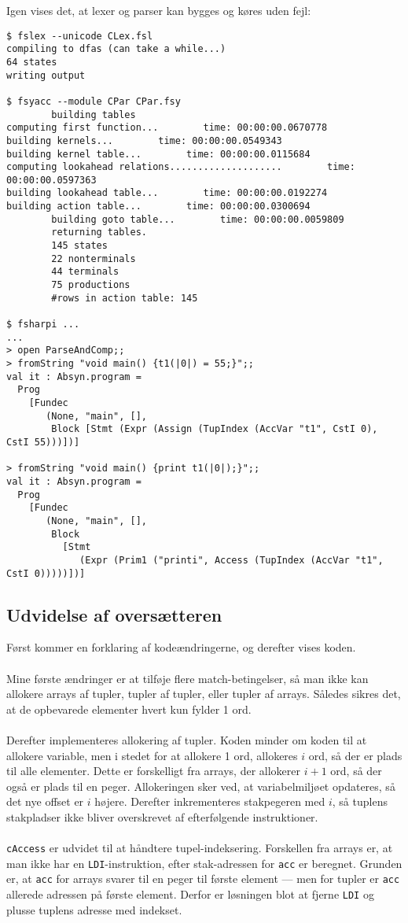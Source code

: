 Igen vises det, at lexer og parser kan bygges og køres uden fejl:

\begin{verbatim}
$ fslex --unicode CLex.fsl
compiling to dfas (can take a while...)
64 states
writing output

$ fsyacc --module CPar CPar.fsy
        building tables
computing first function...        time: 00:00:00.0670778
building kernels...        time: 00:00:00.0549343
building kernel table...        time: 00:00:00.0115684
computing lookahead relations....................        time: 00:00:00.0597363
building lookahead table...        time: 00:00:00.0192274
building action table...        time: 00:00:00.0300694
        building goto table...        time: 00:00:00.0059809
        returning tables.
        145 states
        22 nonterminals
        44 terminals
        75 productions
        #rows in action table: 145

$ fsharpi ...
...
> open ParseAndComp;;
> fromString "void main() {t1(|0|) = 55;}";;
val it : Absyn.program =
  Prog
    [Fundec
       (None, "main", [],
        Block [Stmt (Expr (Assign (TupIndex (AccVar "t1", CstI 0), CstI 55)))])]

> fromString "void main() {print t1(|0|);}";;
val it : Absyn.program =
  Prog
    [Fundec
       (None, "main", [],
        Block
          [Stmt
             (Expr (Prim1 ("printi", Access (TupIndex (AccVar "t1", CstI 0)))))])]
\end{verbatim}

\subsection{Udvidelse af oversætteren}

Først kommer en forklaring af kodeændringerne, og derefter vises koden.
\\\\
Mine første ændringer er at tilføje flere match-betingelser, så man ikke kan allokere arrays af tupler, tupler af tupler, eller tupler af arrays. Således sikres det, at de opbevarede elementer hvert kun fylder 1 ord.
\\\\
Derefter implementeres allokering af tupler. Koden minder om koden til at allokere variable, men i stedet for at allokere 1 ord, allokeres $i$ ord, så der er plads til alle elementer. Dette er forskelligt fra arrays, der allokerer $i + 1$ ord, så der også er plads til en peger. Allokeringen sker ved, at variabelmiljøet opdateres, så det nye offset er $i$ højere. Derefter inkrementeres stakpegeren med $i$, så tuplens stakpladser ikke bliver overskrevet af efterfølgende instruktioner.
\\\\
\texttt{cAccess} er udvidet til at håndtere tupel-indeksering. Forskellen fra arrays er, at man ikke har en \texttt{LDI}-instruktion, efter stak-adressen for \texttt{acc} er beregnet. Grunden er, at \texttt{acc} for arrays svarer til en peger til første element --- men for tupler er \texttt{acc} allerede adressen på første element. Derfor er løsningen blot at fjerne \texttt{LDI} og plusse tuplens adresse med indekset.

